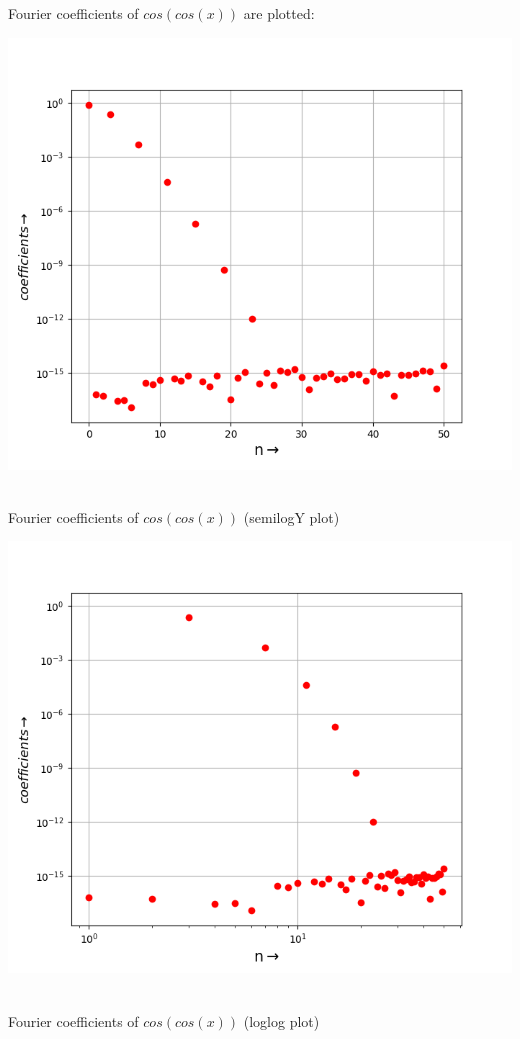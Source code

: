 \documentclass[12pt, a4paper]{report}
\begin{document}
Fourier coefficients of $cos(cos(x))$ are plotted:
\begin{center}
	\includegraphics[scale=0.65]{Figure_5} 
	\caption{\\Fourier coefficients of $cos(cos(x))$ (semilogY plot)}
	\label{fig:rawdata}
\end{center}
\begin{center}
	\includegraphics[scale=0.65]{Figure_6} 
	\caption{\\Fourier coefficients of $cos(cos(x))$ (loglog plot)}
	\label{fig:rawdata}
\end{center}
\end{document}
